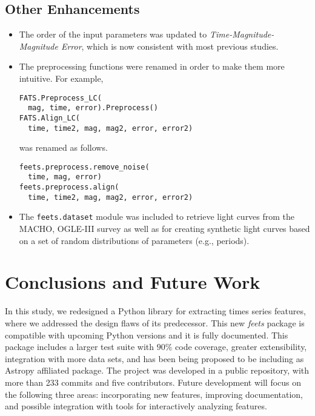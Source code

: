 \documentclass[final,5p,times,twocolumn,authoryear]{elsarticle}
\begin{document}
\subsection{Other Enhancements}
%
\begin{itemize}
\item The order of the input parameters was updated to 
	\textit{Time-Magnitude-Magnitude Error}, which is now
    consistent with most previous studies.
\item The preprocessing functions were renamed in order to make 
	them more intuitive. For example,
\begin{verbatim}
FATS.Preprocess_LC(
  mag, time, error).Preprocess()
FATS.Align_LC(
  time, time2, mag, mag2, error, error2)
\end{verbatim}
%
was renamed as follows.
%
\begin{verbatim}
feets.preprocess.remove_noise(
  time, mag, error)
feets.preprocess.align(
  time, time2, mag, mag2, error, error2)
\end{verbatim}

\item The \texttt{feets.dataset} module was included to retrieve
	light curves from the MACHO, OGLE-III\citep{udalski_optical_2004} 
    survey as well as for creating synthetic light curves based on a set of random distributions of parameters (e.g., periods).
\end{itemize}


\section{Conclusions and Future Work}
\label{section:conclusions}
%
In this study, we redesigned a Python library for extracting times series 
features, where we addressed the design 
flaws of its predecessor. 
This new \textit{feets} package is compatible with upcoming Python versions and it is fully documented.
%
This package includes a larger test suite with $90\%$ code coverage,
greater extensibility, integration with more data sets, 
and has been being proposed to be including as Astropy affiliated package.
%
The project was developed in a public repository,
with more than 233 commits and five contributors. 
%
Future development will focus on the following three areas: incorporating
new features, improving documentation, and 
possible integration with tools for interactively analyzing features.
\end{document}
